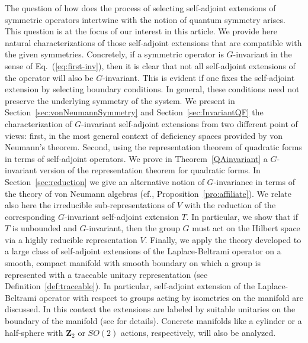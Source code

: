\documentclass[a4paper,12pt]{amsart}
\newcommand{\1}{\mathbb{I}}
\numberwithin{equation}{section}
\numberwithin{theorem}{section}
\begin{document}
The question of how does the process of selecting self-adjoint extensions of symmetric operators intertwine with the notion of quantum symmetry arises. This question is at the focus of our interest in this article.
We provide here natural characterizations of those self-adjoint extensions that are compatible
with the given symmetries. Concretely, if a symmetric operator is $G$-invariant in the sense of 
Eq.~(\ref{eq:first-inv}), then it is clear that 
not all self-adjoint extensions of the operator will also be $G$-invariant. 
This is evident if one fixes the self-adjoint extension by selecting boundary conditions. In general,
these conditions need not preserve the underlying symmetry of the system.
We present in Section~\ref{sec:vonNeumannSymmetry} and Section~\ref{sec:InvariantQF}
the characterization of $G$-invariant self-adjoint extensions from two different point of views: 
first, in the most general context of deficiency spaces provided by von Neumann's theorem.
Second, using the representation theorem of quadratic forms in terms of self-adjoint operators.
We prove in Theorem~\ref{QAinvariant} a $G$-invariant version of the representation theorem for quadratic forms.
In Section~\ref{sec:reduction} we give an alternative notion of $G$-invariance in terms of the 
theory of von Neumann algebras (cf., Proposition~\ref{pro:affiliate}). We relate also here
the irreducible sub-representations of $V$ with the reduction of 
the corresponding $G$-invariant self-adjoint extension $T$. In particular, we show that 
if $T$ is unbounded and $G$-invariant, then the group $G$ must act on the Hilbert space via a highly reducible representation $V$.
Finally, we apply the theory developed to a large class of self-adjoint extensions of the Laplace-Beltrami operator
on a smooth, compact manifold with smooth boundary on which a group is represented with a traceable unitary representation
(see Definition~\ref{def:traceable}).
In particular, self-adjoint extension of the Laplace-Beltrami operator with respect to groups acting by isometries 
on the manifold are discussed.
In this context the extensions are labeled by suitable unitaries on the boundary of
the manifold (see \cite{ILP13} for details). Concrete manifolds like a cylinder or a half-sphere
with $\mathbf{Z}_2$ or $SO(2)$ actions, respectively, will also be analyzed.
\end{document}

